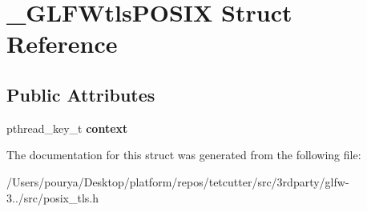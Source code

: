 \hypertarget{struct__GLFWtlsPOSIX}{}\section{\+\_\+\+G\+L\+F\+Wtls\+P\+O\+S\+I\+X Struct Reference}
\label{struct__GLFWtlsPOSIX}
\subsection*{Public Attributes}
\begin{DoxyCompactItemize}
\item 
\hypertarget{struct__GLFWtlsPOSIX_ae48542bddd310feed32eaf5eb7e9f250}{}pthread\+\_\+key\+\_\+t {\bfseries context}\label{struct__GLFWtlsPOSIX_ae48542bddd310feed32eaf5eb7e9f250}

\end{DoxyCompactItemize}


The documentation for this struct was generated from the following file\+:\begin{DoxyCompactItemize}
\item 
/\+Users/pourya/\+Desktop/platform/repos/tetcutter/src/3rdparty/glfw-\/3../src/posix\+\_\+tls.\+h\end{DoxyCompactItemize}
